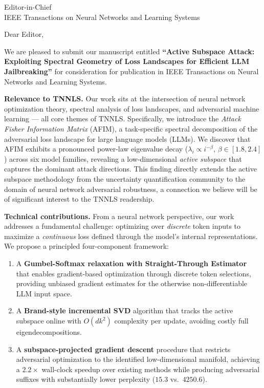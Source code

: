 \documentclass[11pt]{letter}
\date{\today}
\begin{document}
\begin{letter}{Editor-in-Chief\\
IEEE Transactions on Neural Networks and Learning Systems}

\opening{Dear Editor,}

We are pleased to submit our manuscript entitled \textbf{``Active Subspace Attack: Exploiting Spectral Geometry of Loss Landscapes for Efficient LLM Jailbreaking''} for consideration for publication in IEEE Transactions on Neural Networks and Learning Systems.

\textbf{Relevance to TNNLS.} Our work sits at the intersection of neural network optimization theory, spectral analysis of loss landscapes, and adversarial machine learning --- all core themes of TNNLS. Specifically, we introduce the \emph{Attack Fisher Information Matrix} (AFIM), a task-specific spectral decomposition of the adversarial loss landscape for large language models (LLMs). We discover that AFIM exhibits a pronounced power-law eigenvalue decay ($\lambda_i \propto i^{-\beta}$, $\beta \in [1.8, 2.4]$) across six model families, revealing a low-dimensional \emph{active subspace} that captures the dominant attack directions. This finding directly extends the active subspace methodology from the uncertainty quantification community to the domain of neural network adversarial robustness, a connection we believe will be of significant interest to the TNNLS readership.

\textbf{Technical contributions.} From a neural network perspective, our work addresses a fundamental challenge: optimizing over \emph{discrete} token inputs to maximize a \emph{continuous} loss defined through the model's internal representations. We propose a principled four-component framework:

\begin{enumerate}
  \item A \textbf{Gumbel-Softmax relaxation with Straight-Through Estimator} that enables gradient-based optimization through discrete token selections, providing unbiased gradient estimates for the otherwise non-differentiable LLM input space.
  
  \item A \textbf{Brand-style incremental SVD} algorithm that tracks the active subspace online with $O(dk^2)$ complexity per update, avoiding costly full eigendecompositions.
  
  \item A \textbf{subspace-projected gradient descent} procedure that restricts adversarial optimization to the identified low-dimensional manifold, achieving a $2.2\times$ wall-clock speedup over existing methods while producing adversarial suffixes with substantially lower perplexity ($15.3$ vs.\ $4250.6$).
  

\end{enumerate}
\end{letter}
\end{document}
